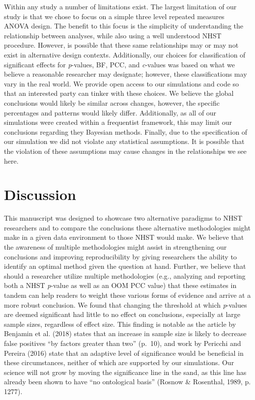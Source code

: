 \documentclass[,man, mask]{apa6}
\theoremstyle{definition}
\theoremstyle{definition}
\theoremstyle{definition}
\theoremstyle{remark}
\begin{document}
Within any study a number of limitations exist. The largest limitation
of our study is that we chose to focus on a simple three level repeated
measures ANOVA design. The benefit to this focus is the simplicity of
understanding the relationship between analyses, while also using a well
understood NHST procedure. However, is possible that these same
relationships may or may not exist in alternative design contexts.
Additionally, our choices for classification of significant effects for
\emph{p}-values, BF, PCC, and \emph{c}-values was based on what we
believe a reasonable researcher may designate; however, these
classifications may vary in the real world. We provide open access to
our simulations and code so that an interested party can tinker with
these choices. We believe the global conclusions would likely be similar
across changes, however, the specific percentages and patterns would
likely differ. Additionally, as all of our simulations were created
within a frequentist framework, this may limit our conclusions regarding
they Bayesian methods. Finally, due to the specification of our
simulation we did not violate any statistical assumptions. It is
possible that the violation of these assumptions may cause changes in
the relationships we see here.

\section{Discussion}\label{discussion}

This manuscript was designed to showcase two alternative paradigms to
NHST researchers and to compare the conclusions these alternative
methodologies might make in a given data environment to those NHST would
make. We believe that the awareness of multiple methodologies might
assist in strengthening our conclusions and improving reproducibility by
giving researchers the ability to identify an optimal method given the
question at hand. Further, we believe that should a researcher utilize
multiple methodologies (e.g., analyzing and reporting both a NHST
\emph{p}-value as well as an OOM PCC value) that these estimates in
tandem can help readers to weight these various forms of evidence and
arrive at a more robust conclusion. We found that changing the threshold
at which \emph{p}-values are deemed significant had little to no effect
on conclusions, especially at large sample sizes, regardless of effect
size. This finding is notable as the article by Benjamin et al. (2018)
states that an increase in sample size is likely to decrease false
positives \enquote{by factors greater than two} (p.~10), and work by
Pericchi and Pereira (2016) state that an adaptive level of significance
would be beneficial in these circumstances, neither of which are
supported by our simulations. Our science will not grow by moving the
significance line in the sand, as this line has already been shown to
have \enquote{no ontological basis} (Rosnow \& Rosenthal, 1989, p.
1277).
\end{document}
